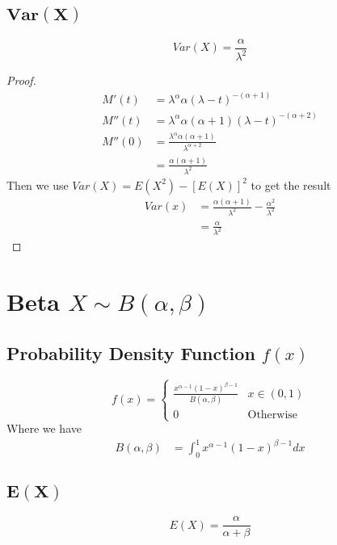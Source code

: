 \documentclass[12pt]{article}
\begin{document}
\subsection{$\bm{Var(X)}$}
\begin{equation*}
  Var(X)= \frac{\alpha}{\lambda^{2}}
\end{equation*}
\begin{proof}
  \begin{align*}
    M'(t) &= \lambda^{\alpha} \alpha (\lambda-t)^{-(\alpha+1)}\\
    M''(t) &= \lambda^{\alpha} \alpha (\alpha+1) (\lambda-t)^{-(\alpha+2)}\\
    M''(0) &= \frac{\lambda^{\alpha}\alpha(\alpha+1)}{\lambda^{\alpha+2}}\\
           &= \frac{\alpha(\alpha+1)}{\lambda^{2}}
  \end{align*}
Then we use $Var(X)=E(X^{2})-[E(X)]^{2}$ to get the result
\begin{align*}
  Var(x)&= \frac{\alpha(\alpha+1)}{\lambda^{2}}  - \frac{\alpha^{2}}{\lambda^{2}} \\
        &= \frac{\alpha}{\lambda^{2}}
\end{align*}
\end{proof}
\newpage
\section{Beta $X \sim B(\alpha,\beta)$}
\subsection{Probability Density Function $f(x)$}

\begin{equation*}
  f(x) =
  \begin{cases}
     \frac{x^{\alpha -1} (1-x)^{\beta -1}}{B(\alpha,\beta)} & x \in (0,1) \\
     0 & \text{Otherwise}
  \end{cases}
\end{equation*}
Where we have
\begin{align*}
  B(\alpha,\beta) &= \int_{0}^{1}x^{\alpha -1}(1-x)^{\beta -1} dx
\end{align*}

\subsection{$\bm{E(X)}$}

\begin{equation*}
  E(X) = \frac{\alpha}{\alpha + \beta}
\end{equation*}
\end{document}
